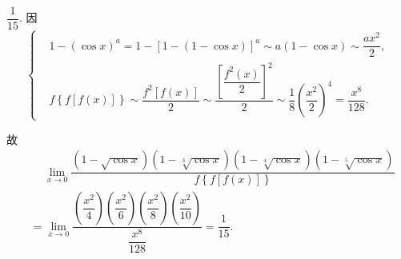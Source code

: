 \documentclass[lang=cn,12pt]{elegantbook}
\begin{document}
\begin{solution}
  $\dfrac{1}{15}.$ 
  因 $$\begin{cases}
    &1- \left(\cos x\right)^a = 1 - \left[1-\left(1-\cos x\right)\right]^a 
      \sim a(1-\cos x) \sim \dfrac{ax^2}{2},\\
    &f\left\{f\left[f\left(x\right)\right]\right\} \sim 
      \dfrac{f^2\left[f\left(x\right)\right]}{2} \sim
      \dfrac{\left[\dfrac{f^2\left(x\right)}{2}\right]^2}{2}\sim 
      \dfrac{1}{8}\left(\dfrac{x^2}{2}\right)^4 = \dfrac{x^8}{128}.
  \end{cases}$$

  故 $$\begin{aligned}
    &\quad \ \lim\limits_{x \to 0} 
      \dfrac{\left(1-\sqrt{\cos x}\right)\left(1-\sqrt[3]{\cos x}\right)
      \left(1-\sqrt[4]{\cos x}\right)\left(1-\sqrt[5]{\cos x}\right)}
      {f\left\{f\left[f\left(x\right)\right]\right\}} \\
    &= \lim\limits_{x \to 0} \dfrac{\left(\dfrac{x^2}{4}\right)\left(\dfrac{x^2}{6}\right)
    \left(\dfrac{x^2}{8}\right)\left(\dfrac{x^2}{10}\right)}
    {\dfrac{x^8}{128}}=\dfrac{1}{15}.
  \end{aligned}$$

\end{solution}
\end{document}
